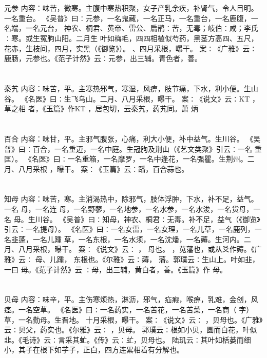 \documentclass[12pt,UTF8]{ctexbook}
\begin{document}
\chapter{}元参
内容：味苦，微寒。主腹中寒热积聚，女子产乳余疾，补肾气，令人目明。一名重台。 
《吴普》曰∶元参，一名鬼藏，一名正马，一名重台，一名鹿腹，一名端，一名元台， 
神农、桐君、黄帝、雷公、扁鹊∶苦，无毒；岐伯∶咸；李氏∶寒。或生冤朐山阳。二月生 
叶如梅毛，四四相植似芍药，黑茎方高四、五尺，花赤，生枝间，四月，实黑（《御览》）。 
、四月采根，曝干。 
案∶《广雅》云∶鹿肠，元参也。《范子计然》云∶元参，出三辅。青色者，善。 


\chapter{}秦艽
内容：味苦，平。主寒热邪气，寒湿，风痹，肢节痛，下水，利小便。生山谷。 
《名医》曰∶生飞乌山。二月、八月采根，曝干。 
案∶《说文》云∶KT ，草之相 者，《玉篇》作KT ，居包切，云秦艽，药艽同。萧 
炳 


\chapter{}百合
内容：味甘，平。主邪气腹张，心痛，利大小便，补中益气。生川谷。 
《吴普》曰∶百合，一名重迈，一名中庭。生冠朐及荆山（《艺文类聚》引云∶一名 
重匡）。 
《名医》曰∶一名重箱，一名摩罗，一名中逢花，一名强瞿。生荆州。二月、八月采根 
，曝干。 
案∶《玉篇》云∶蹯，百合蒜也。 


\chapter{}知母
内容：味苦，寒。主消渴热中，除邪气，肢体浮肿，下水，补不足，益气。一名 母，一名连 
母，一名野蓼，一名地参，一名水参，一名水浚，一名货母，一名 母。生川谷。 
《吴普》曰∶知母，神农、桐君∶无毒。补不足，益气（《御览》引云∶一名提母）。 
《名医》曰∶一名女雷，一名女理，一名儿草，一名鹿列，一名韭蓬，一名儿踵 
草，一名东根，一名水须，一名沈燔，一名薅。生河内。二月、八月采根，曝干。 
案∶《说文》云∶ ， 母也。 ，苋藩也，或从爻作薅。《广雅》云∶ 母、儿踵， 
东根也。《尔雅》云∶薅， 藩。郭璞云∶生山上。叶如韭，一曰 母。《范子计然》云 
∶母，出三辅，黄白者，善。《玉篇》作 母。 


\chapter{}贝母
内容：味辛，平。主伤寒烦热，淋沥，邪气，疝瘕，喉痹，乳难，金创，风痉。一名空草。 
《名医》曰∶一名药实，一名苦花，一名苦菜，一名商（ 字）草，一名勤母。生晋地。 
十月采根，曝干。 
案∶《说文》云∶ ，贝母也。《广雅》云∶贝父，药实也。《尔雅》云∶ ，贝母。 
郭璞云∶根如小贝，圆而白花，叶似韭。《毛诗》云∶言采其虻。《传》云∶虻，贝母也。 
陆玑云∶其叶如栝蒌而细小，其子在根下如芋子，正白，四方连累相着有分解也。 
\end{document}
